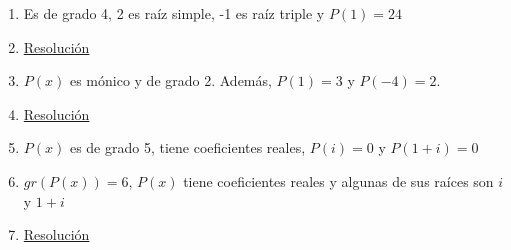 \documentclass[a4paper]{article}
\newcommand{\answer}{\item[**]}
\begin{document}
\begin{enumerate}
\begin{multicols}{2}
\begin{enumerate} [label=(\alph*)]
		\item Es de grado 4, 2 es raíz simple, -1 es raíz triple y $P(1)=24$
		\answer \href{https://youtu.be/_XVYatmUKBg}{Resolución}

		\item $P(x)$ es mónico y de grado 2. Además, $P(1)=3$ y $P(-4)=2$.
		\answer \href{https://youtu.be/LDpq_f-baPc}{Resolución}

		\item $P(x)$ es de grado 5, tiene coeficientes reales, $P(i)=0$ y $P(1+i)=0$

		\item $gr\left(P(x)\right)=6$, $P(x)$ tiene coeficientes reales y algunas de sus raíces son $i$ y $1+i$
		\answer \href{https://youtu.be/LDpq_f-baPc}{Resolución}


	\end{enumerate}
	\end{multicols}


\end{enumerate}
\end{document}
